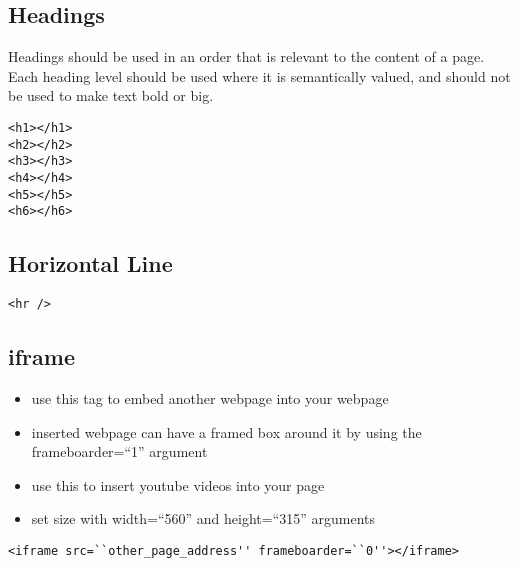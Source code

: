 \documentclass{article}
\begin{document}
\subsection{Headings}
Headings should be used in an order that is relevant to the content of a page.
Each heading level should be used where it is semantically valued, and should
not be used to make text bold or big.

\begin{lstlisting}
<h1></h1>
<h2></h2>
<h3></h3>
<h4></h4>
<h5></h5>
<h6></h6>
\end{lstlisting}

\subsection{Horizontal Line}
\begin{lstlisting}
<hr />
\end{lstlisting}

\subsection{iframe}
\begin{itemize}
  \item use this tag to embed another webpage into your webpage
  \item inserted webpage can have a framed box around it by using the
        frameboarder=``1'' argument
  \item use this to insert youtube videos into your page
  \item set size with width=``560'' and height=``315'' arguments
\end{itemize}

\begin{lstlisting}
<iframe src=``other_page_address'' frameboarder=``0''></iframe>
\end{lstlisting}

\end{document}
